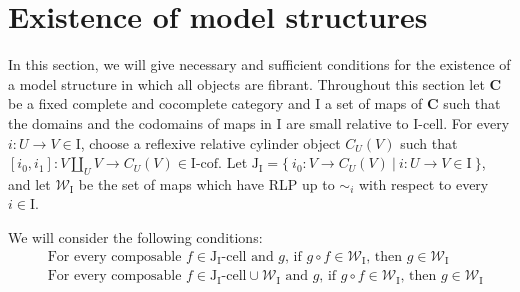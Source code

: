 \documentclass{tac}
\theoremstyle{definition}
\newcommand{\we}{\mathcal{W}}
\newcommand{\cat}[1]{\mathbf{#1}}
\newcommand{\C}{\cat{C}}
\newcommand{\I}{\mathrm{I}}
\newcommand{\J}{\mathrm{J}}
\newcommand{\class}[2]{#1\text{-}\mathrm{#2}}
\newcommand{\Icell}[1][\I]{\class{#1}{cell}}
\newcommand{\Icof}[1][\I]{\class{#1}{cof}}
\newcommand{\Jcell}[1][]{\Icell[\J#1]}
\newcommand{\cyli}{i}
\begin{document}
\section{Existence of model structures}

In this section, we will give necessary and sufficient conditions for the existence of a model structure in which all objects are fibrant.
Throughout this section let $\C$ be a fixed complete and cocomplete category and $\I$ a set of maps of $\C$
such that the domains and the codomains of maps in $\I$ are small relative to $\Icell$.
For every $i : U \to V \in \I$, choose a reflexive relative cylinder object $C_U(V)$
such that $[\cyli_0,\cyli_1] : V \amalg_U V \to C_U(V) \in \Icof$.
Let $\J_\I = \{\ \cyli_0 : V \to C_U(V)\ |\ i : U \to V \in \I \ \}$, and
let $\we_\I$ be the set of maps which have RLP up to $\sim_i$ with respect to every $i \in \I$.

We will consider the following conditions:
\begin{align}
& \text{For every composable $f \in \Jcell[_\I]$ and $g$, if $g \circ f \in \we_\I$, then $g \in \we_\I$} \label{cond:main} \tag{*} \\
& \text{For every composable $f \in \Jcell[_\I] \cup \we_\I$ and $g$, if $g \circ f \in \we_\I$, then $g \in \we_\I$} \label{cond:strong-main} \tag{*'}
\end{align}
\end{document}
